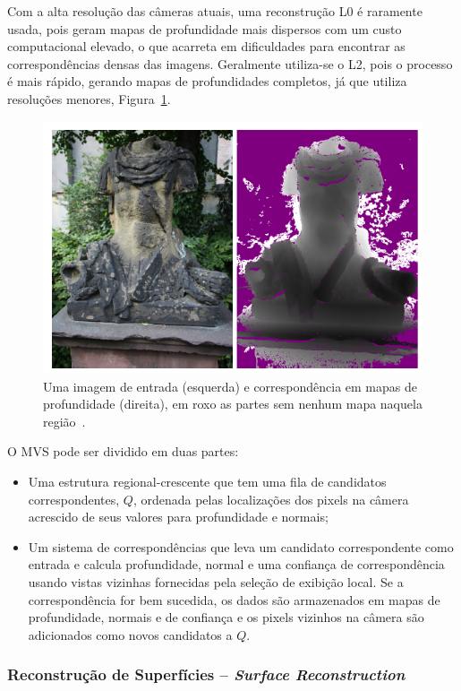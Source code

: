 Com a alta resolução das câmeras atuais, uma reconstrução L0 é raramente usada, pois
geram mapas de profundidade mais dispersos com um custo computacional elevado, o
que acarreta em dificuldades para encontrar as correspondências densas das
imagens. Geralmente utiliza-se o L2, pois o processo é mais rápido, gerando
mapas de profundidades completos, já que utiliza resoluções menores, Figura~\ref{fig:mvedepth}.

\begin{figure}[!h]
	\centering
	\includegraphics[width=0.7\linewidth]{figs/mvedepth.png}
	\caption{%
  Uma imagem de entrada (esquerda) e correspondência em mapas de
  profundidade (direita), em roxo as partes sem nenhum mapa naquela região~\protect\cite{mve}.
	}\label{fig:mvedepth}
\end{figure}

O MVS pode ser dividido em duas partes:
\begin{itemize}
\item {Uma estrutura regional-crescente que tem uma fila de candidatos
  correspondentes, $Q$, ordenada pelas localizações dos pixels na câmera
acrescido de seus valores para profundidade e normais;}
\item {Um sistema de correspondências que leva um candidato correspondente como
  entrada e calcula profundidade, normal e uma confiança de correspondência
usando vistas vizinhas fornecidas pela seleção de exibição local. Se a
correspondência for bem sucedida, os dados são armazenados em mapas de
profundidade, normais e de confiança e os pixels vizinhos na câmera são
adicionados como novos candidatos a $Q$.}
\end{itemize}

\subsubsection*{Reconstrução de Superfícies -- \emph{Surface Reconstruction}}

